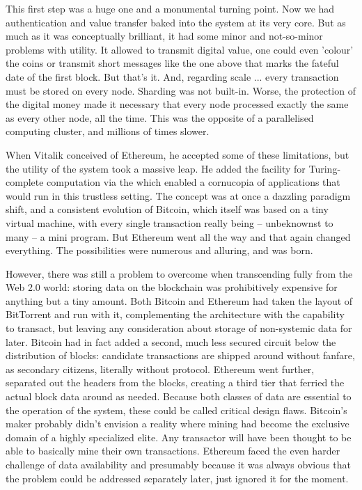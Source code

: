 This first step was a huge one and a monumental turning point. Now we had authentication and value transfer baked into the system at its very core. But as much as it was conceptually brilliant, it had some minor and not-so-minor problems with utility. It allowed to transmit digital value, one could even 'colour' the coins or transmit short messages like the one above that marks the fateful date of the first block. But that's it. And, regarding scale ... every transaction must be stored on every node. Sharding was not built-in. Worse, the protection of the digital money made it necessary that every node processed exactly the same as every other node, all the time. This was the opposite of a parallelised computing cluster, and millions of times slower.

When Vitalik conceived of Ethereum, he accepted some of these limitations, but the utility of the system took a massive leap. He added the facility for Turing-complete computation via the  which enabled a cornucopia of applications that would run in this trustless setting. The concept was at once a dazzling paradigm shift, and a consistent evolution of Bitcoin, which itself was based on a tiny virtual machine, with every single transaction really being – unbeknownst to many – a mini program. But Ethereum went all the way and that again changed everything. The possibilities were numerous and alluring, and  was born.

However, there was still a problem to overcome when transcending fully from the Web 2.0 world: storing data on the blockchain was prohibitively expensive for anything but a tiny amount. Both Bitcoin and Ethereum had taken the layout of BitTorrent and run with it, complementing the architecture with the capability to transact, but leaving any consideration about storage of non-systemic data for later. Bitcoin had in fact added a second, much less secured circuit below the distribution of blocks: candidate transactions are shipped around without fanfare, as secondary citizens, literally without protocol. Ethereum went further, separated out the headers from the blocks, creating a third tier that ferried the actual block data around as needed. Because both classes of data are essential to the operation of the system, these could be called critical design flaws. Bitcoin's maker probably didn't envision a reality where mining had become the exclusive domain of a highly specialized elite. Any transactor will have been thought to be able to basically mine their own transactions. Ethereum faced the even harder challenge of data availability and presumably because it was always obvious that the problem could be addressed separately later, just ignored it for the moment. 

